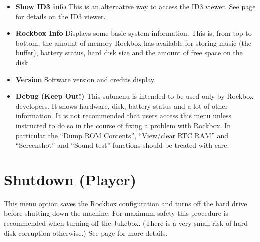 \begin{itemize}
  
\item \textbf{Show ID3 info}
  This is an alternative way to access the ID3 viewer.  See page \pageref{ref:ID3viewer} for details on the ID3 viewer.
\item \textbf{Rockbox Info}
  Displays some basic system information.  This is, from top to bottom, the amount of memory Rockbox has available for storing music (the buffer), battery status, hard disk size and the amount of free space on the disk.
  
\item \textbf{Version}
  Software version and credits display.
  
\item \textbf{Debug (Keep Out!)}
  This submenu is intended to be used only by Rockbox developers. It shows hardware, disk, battery status and a lot of other information.  It is not recommended that users access this menu unless instructed to do so in the course of fixing a problem with Rockbox.  In particular the ``Dump ROM Contents'', ``View/clear RTC RAM'' and ``Screenshot'' and ``Sound test'' functions should be treated with care.
\end{itemize}

\section{Shutdown (Player)}
This menu option saves the Rockbox configuration and turns off the hard drive before shutting down the machine. For maximum safety this procedure is recommended when turning off the Jukebox. (There is a very small risk of hard disk corruption otherwise.) See page \pageref{ref:Safeshutdown} for more details.